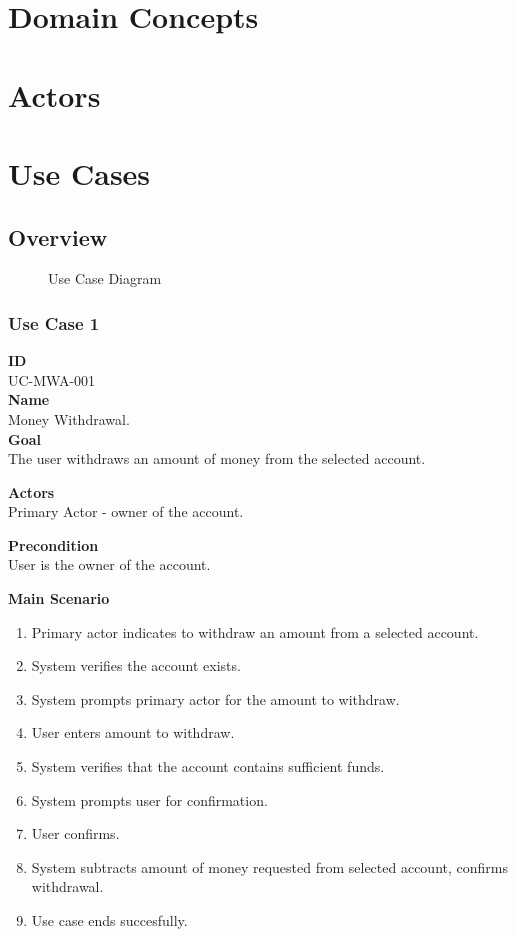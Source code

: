 \documentclass[12pt]{article}
\begin{document}
\section{Domain Concepts}

\section{Actors}

\section{Use Cases}

\subsection{Overview}

\begin{figure}[htbp]
\caption{Use Case Diagram}
\label{fig:use-case-diagram}
\end{figure}

\subsubsection{Use Case 1} \label{uc:1}

\noindent
{\bf ID}\\
UC-MWA-001\\
    
\noindent
{\bf Name}\\
Money Withdrawal.\\

\noindent
{\bf Goal}\\
The user withdraws an amount of money from the selected account.

\noindent
{\bf Actors}\\
Primary Actor - owner of the account.

\noindent
{\bf Precondition}\\
User is the owner of the account.

\noindent
{\bf Main Scenario}\\
\vspace*{-0.2in}
\begin{enumerate}
  \item Primary actor indicates to withdraw an amount from a selected account.
  \item System verifies the account exists.
  \item System prompts primary actor for the amount to withdraw.
  \item User enters amount to withdraw.
  \item System verifies that the account contains sufficient funds.
  \item System prompts user for confirmation.
  \item User confirms.
  \item System subtracts amount of money requested from selected account, confirms withdrawal.
  \item Use case ends succesfully.
\end{enumerate}
\end{document}
